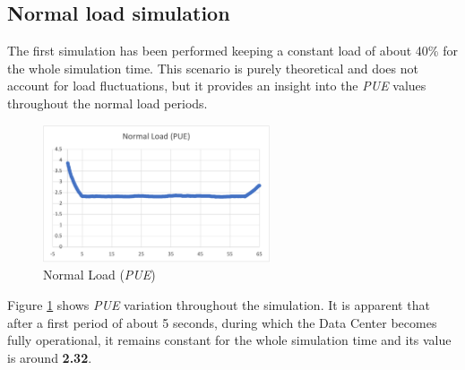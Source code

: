 \subsection{Normal load simulation} \label{subsection:normalload}
The first simulation has been performed keeping a constant load of about 40\% for the whole simulation time. This scenario is purely theoretical and does not account for load fluctuations, but it provides an insight into the \emph{PUE} values throughout the normal load periods. 
\begin{figure}[h]
    \centering
    \includegraphics[width=0.6\textwidth]{chapters/images/normal_load_pue.png}
    \caption{Normal Load (\emph{PUE})}
    \label{fig:normal_load_pue}
\end{figure}
Figure \ref{fig:normal_load_pue} shows \emph{PUE} variation throughout the simulation. It is apparent that after a first period of about 5 seconds, during which the Data Center becomes fully operational, it remains constant for the whole simulation time and its value is around \textbf{2.32}. 

